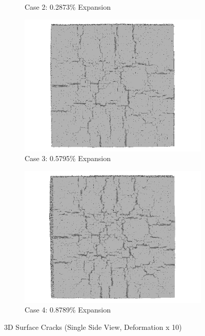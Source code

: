 \begin{figure}[!h]
\begin{subfigure}{.5\textwidth}
    \caption{Case 2: 0.2873\% Expansion}
    \end{subfigure}%
    \begin{subfigure}{.5\textwidth}
      \centering
      \includegraphics[width=.8\linewidth]{Files/exp_3D/DEF/A30X0C_3_3ds.png}
    \caption{Case 3: 0.5795\% Expansion}
    \end{subfigure}
    \begin{subfigure}{.5\textwidth}
      \centering
      \includegraphics[width=.8\linewidth]{Files/exp_3D/DEF/A30X0C_4_3ds.png}
    \caption{Case 4: 0.8789\% Expansion}
    \end{subfigure}%

  \caption{3D Surface Cracks (Single Side View, Deformation x 10)}
  \label{fig:DEF_A30X0C_3DS}
\end{figure}

